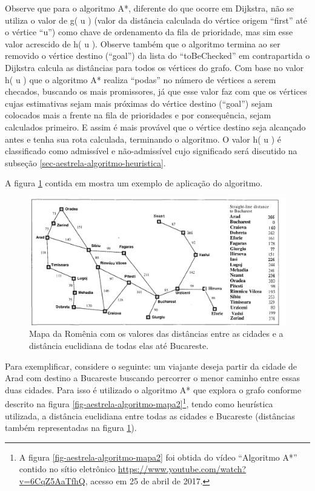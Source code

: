 Observe que para o algoritmo A*, diferente do que ocorre em Dijkstra, não se utiliza o valor de g( u ) (valor da distância calculada do vértice origem ``first'' até o vértice ``u'') como chave de ordenamento da fila de prioridade, mas sim esse valor acrescido de h( u ). Observe também que o algoritmo termina ao ser removido o vértice destino (``goal'') da lista do ``toBeChecked'' em contrapartida o Dijkstra calcula as distâncias para todos os vértices do grafo. Com base no valor h( u ) que o algoritmo A* realiza ``podas'' no número de vértices a serem checados, buscando os mais promissores, já que esse valor faz com que os vértices cujas estimativas sejam mais próximas do vértice destino (``goal'') sejam colocados mais a frente na fila de prioridades e por consequência, sejam calculados primeiro. E assim é mais provável que o vértice destino seja alcançado antes e tenha sua rota calculada, terminando o algoritmo. O valor h( u ) é classificado como admissível e não-admissível cujo significado será discutido na subseção \ref{sec-aestrela-algoritmo-heuristica}.

A figura \ref{fig-aestrela-algoritmo-mapa1} contida em  mostra um exemplo de aplicação do algoritmo.

\begin{figure}[H]
\centering
\includegraphics[width=.90\textwidth]{figuras/Aestrela-mapa1} 
\caption{Mapa da Romênia com os valores das distâncias entre as cidades e a distância euclidiana de todas elas até Bucareste.}
\label{fig-aestrela-algoritmo-mapa1}
\end{figure}
\newpage
Para exemplificar, considere o seguinte: um viajante deseja partir da cidade de Arad com destino a Bucareste buscando percorrer o menor caminho entre essas duas cidades. Para isso é utilizado o algoritmo A* que explora o grafo conforme descrito na figura \ref{fig-aestrela-algoritmo-mapa2}\footnote{A figura \ref{fig-aestrela-algoritmo-mapa2} foi obtida do vídeo ``Algoritmo A*'' contido no sítio eletrônico \url{https://www.youtube.com/watch?v=6CqZ5AaTfhQ}, acesso em 25 de abril de 2017.}, tendo como heurística utilizada, a distância euclidiana entre todas as cidades e Bucareste (distâncias também representadas na figura \ref{fig-aestrela-algoritmo-mapa1}).

